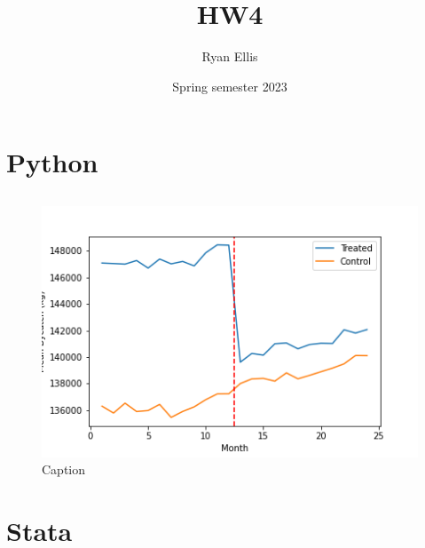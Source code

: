 \documentclass{article}
\title{HW4}
\author{Ryan Ellis}
\date{Spring semester 2023}
\begin{document}
  
\maketitle

\section{Python}
\subsection{}
\begin{figure}[hbt!]
    \centering
    \includegraphics[scale=0.9]{homework4/output/image1.png}
    \caption{Caption}
    \label{fig:my_label}
\end{figure}

\subsection{}

\clearpage
\subsection{}

\begin{table}[hbt!] \centering

\end{table}

\clearpage
\section{Stata}

\subsection{}

\begin{table}[hbt!] \centering


\end{table}
\end{document}
